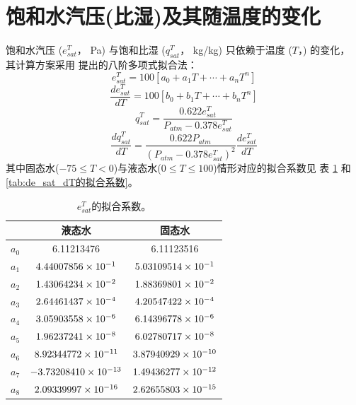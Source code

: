 \section{饱和水汽压(比湿)及其随温度的变化}\label{饱和水汽压(比湿)及其随温度的变化}
饱和水汽压 ($e_{sat}^T$， Pa) 与饱和比湿 ($q_{sat}^T$， kg/kg) 只依赖于温度 ($T$，\textcelsius) 的变化，
其计算方案采用\citet{flatau1992polynomial} 提出的八阶多项式拟合法：
\begin{equation}
e_{s a t}^{T}=100\left[a_{0}+a_{1} T+\cdots+a_{n} T^{n}\right]
\end{equation}
\begin{equation}
\frac{d e_{s a t}^{T}}{d T}=100\left[b_{0}+b_{1} T+\cdots+b_{n} T^{n}\right]
\end{equation}
\begin{equation}
q_{s a t}^{T}=\frac{0.622 e_{s a t}^{T}}{P_{atm}-0.378 e_{s a t}^{T}}
\end{equation}
\begin{equation}
\frac{d q_{{sat }}^{T}}{d T}=\frac{0.622 P_{atm}}{\left(P_{atm}-0.378 e_{{sat }}^{T}\right)^{2}} \frac{d e_{{sat }}^{T}}{d T}
\end{equation}
其中固态水($-75$\textcelsius$\le T<0$\textcelsius)与液态水($0$\textcelsius $\le T\le100$\textcelsius)情形对应的拟合系数见
表 \ref{tab:e_sat_T的拟合系数} 和 \ref{tab:de_sat_dT的拟合系数}。
\begin{table}[]
\centering
\caption{$e_{sat}^T$的拟合系数。}
\label{tab:e_sat_T的拟合系数}
\begin{tabular}{@{}lcc@{}}
\toprule
     &  液态水  & 固态水                         \\ \midrule
$a_0$ & 6.11213476        & 6.11123516       \\
$a_1$ & $\rm 4.44007856 \times 10^{-1}$   & $\rm 5.03109514 \times 10^{-1}$  \\
$a_2$ & $\rm 1.43064234 \times 10^{-2}$   & $\rm 1.88369801 \times 10^{-2}$  \\
$a_3$ & $\rm 2.64461437 \times 10^{-4}$   & $\rm 4.20547422 \times 10^{-4}$  \\
$a_4$ & $\rm 3.05903558 \times 10^{-6}$   & $\rm 6.14396778 \times 10^{-6}$  \\
$a_5$ & $\rm 1.96237241 \times 10^{-8}$   & $\rm 6.02780717 \times 10^{-8}$  \\
$a_6$ & $\rm 8.92344772 \times 10^{-11}$  & $\rm 3.87940929 \times 10^{-10}$ \\
$a_7$ & $\rm -3.73208410 \times 10^{-13}$ & $\rm 1.49436277 \times 10^{-12}$ \\
$a_8$ & $\rm 2.09339997 \times 10^{-16}$  & $\rm 2.62655803 \times 10^{-15}$ \\ \bottomrule
\end{tabular}
\end{table}

